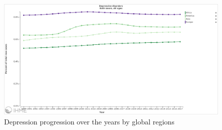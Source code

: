 \documentclass[11pt, notitlepage]{article} %
\begin{document}

\newpage

\appendix
\begin{figure}
	\centering
	\includegraphics[scale=.24]{Figures/depressionprogression.png}
	\caption{Depression progression over the years by global regions} 
	\label{fig:depressionmap}
\end{figure}
\end{document}
